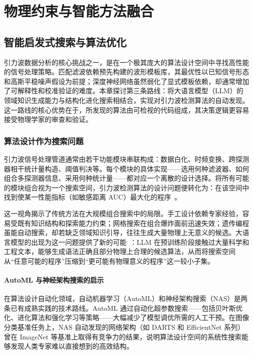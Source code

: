 \pagestyle{mystyle}

\part{物理约束与智能方法融合}

\renewcommand{\parttitle}{物理约束与智能方法融合}

\chapter{智能启发式搜索与算法优化}

引力波数据分析的核心挑战之一，是在一个极其庞大的算法设计空间中寻找高性能的信号处理策略。匹配滤波依赖预先构建的波形模板库，其最优性以已知信号形态和高斯平稳噪声假设为前提；深度神经网络虽然弱化了显式模板依赖，却通常增加了可解释性和校准验证的难度。本章探讨第三条路线：将大语言模型（LLM）的领域知识生成能力与结构化进化搜索相结合，实现对引力波检测算法的自动发现。这一路线的核心优势在于，所发现的算法由可检视的代码组成，其决策逻辑更容易接受物理学家的审查和验证。

\section{算法设计作为搜索问题}

引力波信号处理管道通常由若干功能模块串联构成：数据白化、时频变换、跨探测器相干统计量构造、阈值判决等。每个模块的具体实现——选用何种滤波器、如何组合多探测器信息、采用何种统计量——都对应一个离散的设计选择。将所有可能的模块组合视为一个搜索空间，引力波检测算法的设计问题便转化为：在该空间中找到使某一性能指标（如敏感距离 AUC）最大化的程序~\cite{schafer2023mlgwsc1}。

这一视角揭示了传统方法在大规模组合搜索中的局限。手工设计依赖专家经验，容易受既有知识结构和探索能力约束；网格搜索在组合爆炸面前迅速失效；遗传编程虽能自动搜索，却若缺乏领域知识引导，往往生成大量物理上无意义的候选。大语言模型的出现为这一问题提供了新的可能~\cite{romera2024funsearch}：LLM 在预训练阶段接触过大量科学和工程文本，能够生成语法正确且部分物理上合理的候选算法，从而将搜索空间从“任意可能的程序”压缩到“更可能有物理意义的程序”这一较小子集。

\subsection{AutoML 与神经架构搜索的启示}

在算法设计自动化领域，自动机器学习（AutoML）和神经架构搜索（NAS）是两条已有成熟实践的技术路线。AutoML 通过自动化超参数搜索——包括贝叶斯优化、进化算法和强化学习等策略——大幅减少了模型调优所需的人工干预。在图像分类基准任务上，NAS 自动发现的网络架构（如 DARTS 和 EfficientNet 系列）曾在 ImageNet 等基准上取得有竞争力的结果，说明算法设计空间的系统性搜索能够发现人类专家难以直接想到的高效结构。


